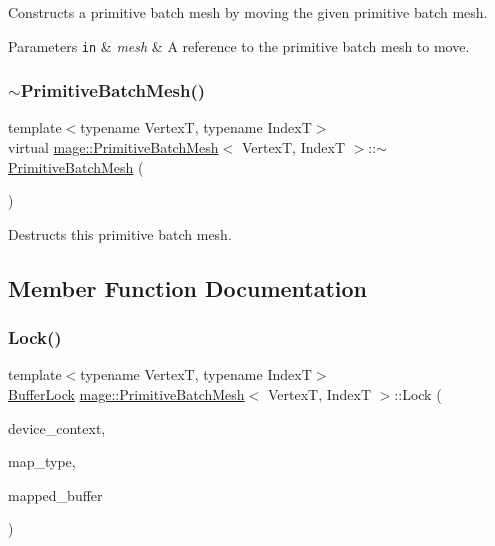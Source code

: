 Constructs a primitive batch mesh by moving the given primitive batch mesh.


\begin{DoxyParams}[1]{Parameters}
\mbox{\tt in}  & {\em mesh} & A reference to the primitive batch mesh to move. \\
\hline
\end{DoxyParams}
\hypertarget{classmage_1_1_primitive_batch_mesh_ad229542ea2d314bc055d3f5ed9d08ddb}{}\label{classmage_1_1_primitive_batch_mesh_ad229542ea2d314bc055d3f5ed9d08ddb} 
\subsubsection{\texorpdfstring{$\sim$\+Primitive\+Batch\+Mesh()}{~PrimitiveBatchMesh()}}
{\footnotesize\ttfamily template$<$typename VertexT, typename IndexT$>$ \\
virtual \hyperlink{classmage_1_1_primitive_batch_mesh}{mage\+::\+Primitive\+Batch\+Mesh}$<$ VertexT, IndexT $>$\+::$\sim$\hyperlink{classmage_1_1_primitive_batch_mesh}{Primitive\+Batch\+Mesh} (\begin{DoxyParamCaption}{ }\end{DoxyParamCaption})\hspace{0.3cm}{\ttfamily [virtual]}}

Destructs this primitive batch mesh. 

\subsection{Member Function Documentation}
\hypertarget{classmage_1_1_primitive_batch_mesh_a35847b2f8b5d442f44d3695aeb8bf6be}{}\label{classmage_1_1_primitive_batch_mesh_a35847b2f8b5d442f44d3695aeb8bf6be} 
\subsubsection{\texorpdfstring{Lock()}{Lock()}}
{\footnotesize\ttfamily template$<$typename VertexT, typename IndexT$>$ \\
\hyperlink{classmage_1_1_buffer_lock}{Buffer\+Lock} \hyperlink{classmage_1_1_primitive_batch_mesh}{mage\+::\+Primitive\+Batch\+Mesh}$<$ VertexT, IndexT $>$\+::Lock (\begin{DoxyParamCaption}\item[{I\+D3\+D11\+Device\+Context4 $\ast$}]{device\+\_\+context,  }\item[{D3\+D11\+\_\+\+M\+AP}]{map\+\_\+type,  }\item[{D3\+D11\+\_\+\+M\+A\+P\+P\+E\+D\+\_\+\+S\+U\+B\+R\+E\+S\+O\+U\+R\+CE $\ast$}]{mapped\+\_\+buffer }\end{DoxyParamCaption})}

